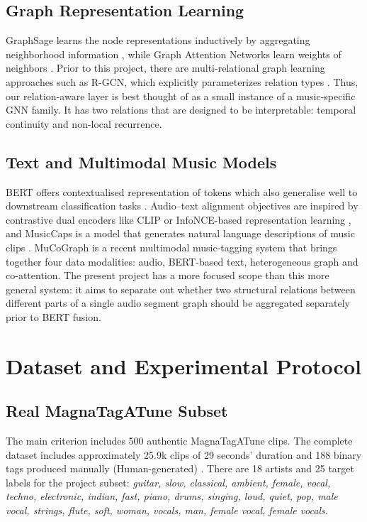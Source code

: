 \documentclass[conference]{IEEEtran}
\begin{document}
\subsection{Graph Representation Learning}
GraphSage learns the node representations inductively by aggregating neighborhood information \cite{hamilton2017}, while Graph Attention Networks learn weights of neighbors \cite{velickovic2018}. Prior to this project, there are multi-relational graph learning approaches such as R-GCN, which explicitly parameterizes relation types \cite{schlichtkrull2018}. Thus, our relation-aware layer is best thought of as a small instance of a music-specific GNN family. It has two relations that are designed to be interpretable: temporal continuity and non-local recurrence.

\subsection{Text and Multimodal Music Models}
BERT offers contextualised representation of tokens which also generalise well to downstream classification tasks \cite{devlin2019}. Audio--text alignment objectives are inspired by contrastive dual encoders like CLIP \cite{radford2021} or InfoNCE-based representation learning \cite{oord2018}, and MusicCaps is a model that generates natural language descriptions of music clips \cite{agostinelli2023}. MuCoGraph is a recent multimodal music-tagging system that brings together four data modalities: audio, BERT-based text, heterogeneous graph and co-attention. The present project has a more focused scope than this more general system: it aims to separate out whether two structural relations between different parts of a single audio segment graph should be aggregated separately prior to BERT fusion.

\section{Dataset and Experimental Protocol}
\subsection{Real MagnaTagATune Subset}
The main criterion includes 500 authentic MagnaTagATune clips. The complete dataset includes approximately 25.9k clips of 29 seconds' duration and 188 binary tags produced manually (Human-generated) \cite{law2009}. There are 18 artists and 25 target labels for the project subset:
\emph{guitar, slow, classical, ambient, female, vocal, techno, electronic, indian, fast, piano, drums, singing, loud, quiet, pop, male vocal, strings, flute, soft, woman, vocals, man, female vocal, female vocals}.
\end{document}
